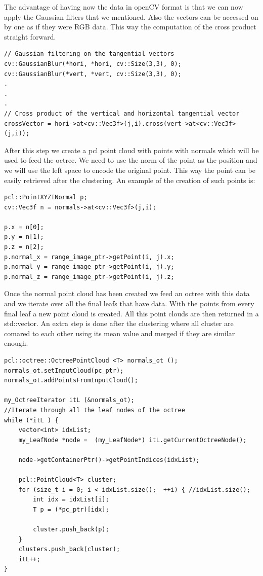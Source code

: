 \documentclass[fontsize=12pt]{article}
\begin{document}
The advantage of having now the data in openCV format is that we can now apply the Gaussian filters that we mentioned. Also the vectors can be accessed on by one as if they were RGB data. This way the computation of the cross product straight forward.

\begin{lstlisting}
// Gaussian filtering on the tangential vectors
cv::GaussianBlur(*hori, *hori, cv::Size(3,3), 0);
cv::GaussianBlur(*vert, *vert, cv::Size(3,3), 0);
.
.
.
// Cross product of the vertical and horizontal tangential vector
crossVector = hori->at<cv::Vec3f>(j,i).cross(vert->at<cv::Vec3f>(j,i));
\end{lstlisting}

After this step we create a pcl point cloud with points with normals which will be used to feed the octree. We need to use the norm of the point as the position and we will use the left space to encode the original point. This way the point can be easily retrieved after the clustering. An example of the creation of such points is:

\begin{lstlisting}
pcl::PointXYZINormal p;
cv::Vec3f n = normals->at<cv::Vec3f>(j,i);

p.x = n[0];
p.y = n[1];
p.z = n[2];
p.normal_x = range_image_ptr->getPoint(i, j).x;
p.normal_y = range_image_ptr->getPoint(i, j).y;
p.normal_z = range_image_ptr->getPoint(i, j).z;
\end{lstlisting}

Once the normal point cloud has been created we feed an octree with this data and we iterate over all the final leafs that have data. With the points from every final leaf a new point cloud is created. All this point clouds are then returned in a std::vector. An extra step is done after the clustering where all cluster are comared to each other using its mean value and merged if they are similar enough.\\

\begin{lstlisting}
pcl::octree::OctreePointCloud <T> normals_ot (); 
normals_ot.setInputCloud(pc_ptr);
normals_ot.addPointsFromInputCloud();

my_OctreeIterator itL (&normals_ot);
//Iterate through all the leaf nodes of the octree
while (*itL ) {
    vector<int> idxList;
    my_LeafNode *node =  (my_LeafNode*) itL.getCurrentOctreeNode();
    
    node->getContainerPtr()->getPointIndices(idxList);

    pcl::PointCloud<T> cluster;
    for (size_t i = 0; i < idxList.size();  ++i) { //idxList.size();
        int idx = idxList[i];
        T p = (*pc_ptr)[idx];
        
        cluster.push_back(p);	
    }
    clusters.push_back(cluster);
    itL++;
}
\end{lstlisting}
\end{document}
